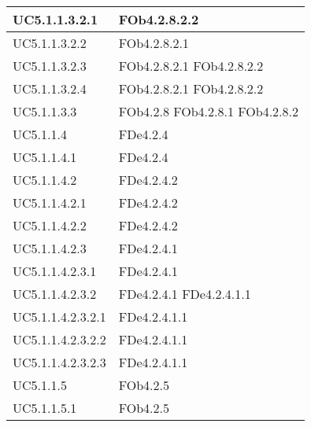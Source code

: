\begin{longtable}{|l|p{4cm}|}
\hline
		UC5.1.1.3.2.1 & FOb4.2.8.2.2 \linebreak   \\
\hline
		UC5.1.1.3.2.2 & FOb4.2.8.2.1 \linebreak   \\
\hline
		UC5.1.1.3.2.3 & FOb4.2.8.2.1 \linebreak  FOb4.2.8.2.2 \linebreak   \\
\hline
		UC5.1.1.3.2.4 & FOb4.2.8.2.1 \linebreak  FOb4.2.8.2.2 \linebreak   \\
\hline
		UC5.1.1.3.3 & FOb4.2.8 \linebreak  FOb4.2.8.1 \linebreak  FOb4.2.8.2 \linebreak   \\
\hline
		UC5.1.1.4 & FDe4.2.4 \linebreak   \\
\hline
		UC5.1.1.4.1 & FDe4.2.4 \linebreak   \\
\hline
		UC5.1.1.4.2 & FDe4.2.4.2 \linebreak   \\
\hline
		UC5.1.1.4.2.1 & FDe4.2.4.2 \linebreak   \\
\hline
		UC5.1.1.4.2.2 & FDe4.2.4.2 \linebreak   \\
\hline
		UC5.1.1.4.2.3 & FDe4.2.4.1 \linebreak   \\
\hline
		UC5.1.1.4.2.3.1 & FDe4.2.4.1 \linebreak   \\
\hline
		UC5.1.1.4.2.3.2 & FDe4.2.4.1 \linebreak  FDe4.2.4.1.1 \linebreak   \\
\hline
		UC5.1.1.4.2.3.2.1 & FDe4.2.4.1.1 \linebreak   \\
\hline
		UC5.1.1.4.2.3.2.2 & FDe4.2.4.1.1 \linebreak   \\
\hline
		UC5.1.1.4.2.3.2.3 & FDe4.2.4.1.1 \linebreak   \\
\hline
		UC5.1.1.5 & FOb4.2.5 \linebreak   \\
\hline
		UC5.1.1.5.1 & FOb4.2.5 \linebreak   \\

\end{longtable}
